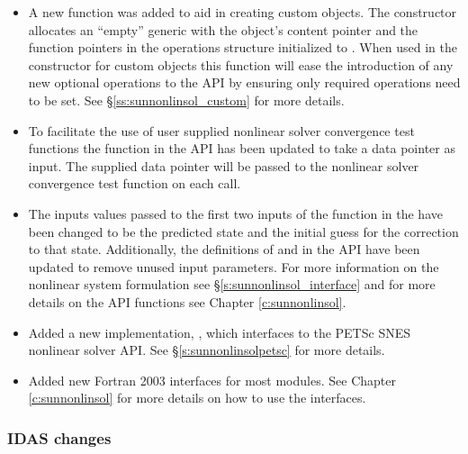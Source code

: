 \begin{itemize}
\item A new function was added to aid in creating custom {\sunnonlinsol}
objects. The constructor  allocates an ``empty''
generic {\sunnonlinsol} with the object's content pointer and the function
pointers in the operations structure initialized to . When used in the
constructor for custom objects this function will ease the introduction of any
new optional operations to the {\sunnonlinsol} API by ensuring only
required operations need to be set. See \S\ref{ss:sunnonlinsol_custom} for more
details.
%
\item To facilitate the use of user supplied nonlinear solver convergence test
functions the \newline\noindent
{} function in the
{\sunnonlinsol} API has been updated to take a  data pointer as
input. The supplied data pointer will be passed to the nonlinear solver
convergence test function on each call.
%
\item The inputs values passed to the first two inputs of the 
function in the {\sunnonlinsol} have been changed to be the predicted
state and the initial guess for the correction to that state. Additionally,
the definitions of  and  in
the {\sunnonlinsol} API have been updated to remove unused input
parameters. For more information on the nonlinear system formulation see
\S\ref{s:sunnonlinsol_interface} and for more details on the API functions see
Chapter \ref{c:sunnonlinsol}.
%
\item Added a new {\sunnonlinsol} implementation, {\sunnonlinsolpetsc}, which
interfaces to the PETSc SNES nonlinear solver API. See
\S\ref{s:sunnonlinsolpetsc} for more details.
%
\item Added new Fortran 2003 interfaces for most {\sunnonlinsol} modules. See
Chapter \ref{c:sunnonlinsol} for more details on how to use the interfaces.
\end{itemize}

\subsubsection*{IDAS changes}

